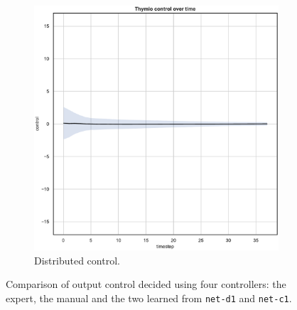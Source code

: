 \begin{figure}[!htb]
\begin{center}
\begin{subfigure}[h]{0.35\textwidth}
			\includegraphics[width=\textwidth]{contents/images/net-d1/control-overtime-learned_distributed}
			\caption{Distributed control.}
		\end{subfigure}
	\end{center}
	\vspace{-0.5cm}
	\caption[Evaluation of the control decided by \texttt{net-c1}.]{Comparison of 
	output control decided using four controllers: the expert, the manual and the 
	two learned from \texttt{net-d1} and \texttt{net-c1}.}
\end{figure}
\medskip
